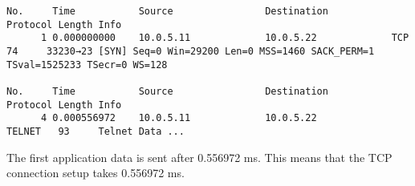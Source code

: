 \begin{verbatim}
No.     Time           Source                Destination           Protocol Length Info
      1 0.000000000    10.0.5.11             10.0.5.22             TCP      74     33230→23 [SYN] Seq=0 Win=29200 Len=0 MSS=1460 SACK_PERM=1 TSval=1525233 TSecr=0 WS=128

No.     Time           Source                Destination           Protocol Length Info
      4 0.000556972    10.0.5.11             10.0.5.22             TELNET   93     Telnet Data ...
\end{verbatim}

The first application data is sent after 0.556972 ms. This means that the TCP connection setup takes 0.556972 ms.